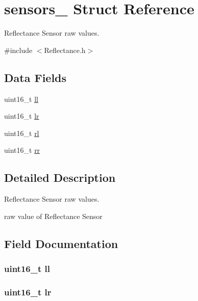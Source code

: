\hypertarget{structsensors__}{}\section{sensors\+\_\+ Struct Reference}
\label{structsensors__}


Reflectance Sensor raw values.  




{\ttfamily \#include $<$Reflectance.\+h$>$}

\subsection*{Data Fields}
\begin{DoxyCompactItemize}
\item 
uint16\+\_\+t \hyperlink{structsensors___ae59d16ddcc59d6f6633ff99307ff7190}{ll}
\item 
uint16\+\_\+t \hyperlink{structsensors___af650f74b54fbe6d55c96161d2a7098ea}{lr}
\item 
uint16\+\_\+t \hyperlink{structsensors___a55f8b53aee5b41e8af88a816fab2b70b}{rl}
\item 
uint16\+\_\+t \hyperlink{structsensors___a6988d1a89f109b3f8d0e06547a5362f6}{rr}
\end{DoxyCompactItemize}


\subsection{Detailed Description}
Reflectance Sensor raw values. 

raw value of Reflectance Sensor 

\subsection{Field Documentation}
\subsubsection[{\texorpdfstring{ll}{ll}}]{\setlength{\rightskip}{0pt plus 5cm}uint16\+\_\+t ll}\hypertarget{structsensors___ae59d16ddcc59d6f6633ff99307ff7190}{}\label{structsensors___ae59d16ddcc59d6f6633ff99307ff7190}
\subsubsection[{\texorpdfstring{lr}{lr}}]{\setlength{\rightskip}{0pt plus 5cm}uint16\+\_\+t lr}\hypertarget{structsensors___af650f74b54fbe6d55c96161d2a7098ea}{}\label{structsensors___af650f74b54fbe6d55c96161d2a7098ea}
